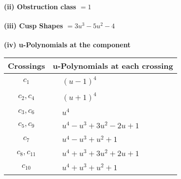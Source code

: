 \documentclass[1p]{elsarticle_modified}
\theoremstyle{definition}
\begin{document}
\flushleft \textbf{(ii) Obstruction class $= 1$}\\~\\
\flushleft \textbf{(iii) Cusp Shapes $= 3 u^3-5 u^2-4$}\\~\\
\newpage\renewcommand{\arraystretch}{1}
\flushleft \textbf{(iv) u-Polynomials at the component}\newline \\
\begin{tabular}{m{50pt}|m{274pt}}
Crossings & \hspace{64pt}u-Polynomials at each crossing \\
\hline $$\begin{aligned}c_{1}\end{aligned}$$&$\begin{aligned}
&(u-1)^4
\end{aligned}$\\
\hline $$\begin{aligned}c_{2},c_{4}\end{aligned}$$&$\begin{aligned}
&(u+1)^4
\end{aligned}$\\
\hline $$\begin{aligned}c_{3},c_{6}\end{aligned}$$&$\begin{aligned}
&u^4
\end{aligned}$\\
\hline $$\begin{aligned}c_{5},c_{9}\end{aligned}$$&$\begin{aligned}
&u^4- u^3+3 u^2-2 u+1
\end{aligned}$\\
\hline $$\begin{aligned}c_{7}\end{aligned}$$&$\begin{aligned}
&u^4- u^3+u^2+1
\end{aligned}$\\
\hline $$\begin{aligned}c_{8},c_{11}\end{aligned}$$&$\begin{aligned}
&u^4+u^3+3 u^2+2 u+1
\end{aligned}$\\
\hline $$\begin{aligned}c_{10}\end{aligned}$$&$\begin{aligned}
&u^4+u^3+u^2+1
\end{aligned}$\\
\hline
\end{tabular}\\~\\
\end{document}
